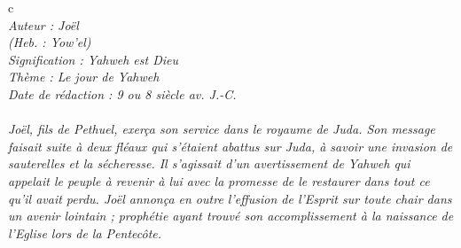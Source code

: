 c\BFont
\noindent\hrulefill
{\footnotesize
\textit{
\bigskip
{\centering{}
\\Auteur : Joël
\\(Heb. : Yow'el)
\\Signification : Yahweh est Dieu
\\Thème : Le jour de Yahweh
\\Date de rédaction : 9 ou 8 siècle av. J.-C.\\}
}
\textit{
\\Joël, fils de Pethuel, exerça son service dans le royaume de Juda. Son message faisait suite à deux fléaux qui s'étaient abattus sur Juda, à savoir une invasion de sauterelles et la sécheresse. Il s'agissait d'un avertissement de Yahweh qui appelait le peuple à revenir à lui avec la promesse de le restaurer dans tout ce qu'il avait perdu. Joël annonça en outre l'effusion de l'Esprit sur toute chair dans un avenir lointain ; prophétie ayant trouvé son accomplissement à la naissance de l'Eglise lors de la Pentecôte.\bigskip
}
}
\par\nobreak\noindent\hrulefill
